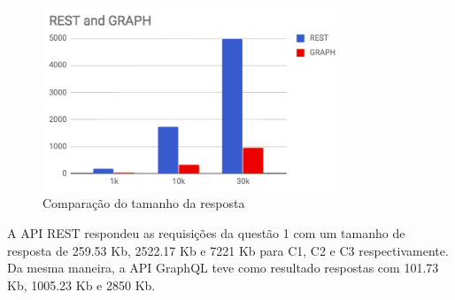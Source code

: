 \begin{figure}[htbp]
    \centering
    \includegraphics[width=0.8\textwidth]{figuras/Q1-size.png}
    \caption{Comparação do tamanho da resposta}
    \label{fig:q2-size}
    \author{fonte: Autor}
\end{figure}

A API REST respondeu as requisições da questão 1 com um tamanho de resposta de 259.53 Kb, 2522.17 Kb e 7221 Kb para C1, C2 e C3 respectivamente. Da mesma maneira, a API GraphQL teve como resultado respostas com 101.73 Kb, 1005.23 Kb e 2850 Kb. 

    